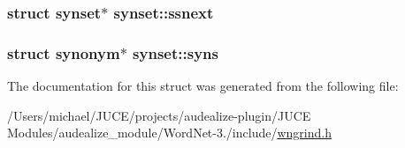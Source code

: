 \subsubsection[{\texorpdfstring{ssnext}{ssnext}}]{\setlength{\rightskip}{0pt plus 5cm}struct {\bf synset}$\ast$ synset\+::ssnext}\hypertarget{structsynset_aba0cb8e929001cfb128d5c9f084e8854}{}\label{structsynset_aba0cb8e929001cfb128d5c9f084e8854}
\subsubsection[{\texorpdfstring{syns}{syns}}]{\setlength{\rightskip}{0pt plus 5cm}struct {\bf synonym}$\ast$ synset\+::syns}\hypertarget{structsynset_a27ca954987020967d38de075237e117e}{}\label{structsynset_a27ca954987020967d38de075237e117e}


The documentation for this struct was generated from the following file\+:\begin{DoxyCompactItemize}
\item 
/\+Users/michael/\+J\+U\+C\+E/projects/audealize-\/plugin/\+J\+U\+C\+E Modules/audealize\+\_\+module/\+Word\+Net-\/3./include/\hyperlink{wngrind_8h}{wngrind.\+h}\end{DoxyCompactItemize}
